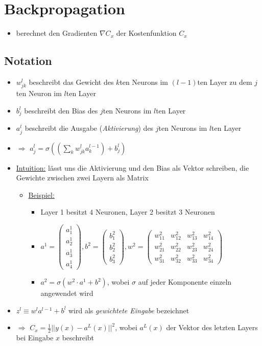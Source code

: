 \section{Backpropagation}

\begin{itemize}
\item berechnet den Gradienten $\nabla C_x$ der Kostenfunktion $C_x$
\end{itemize}

\subsection{Notation}

\begin{itemize}
  \item $w_{jk}^l$ beschreibt das Gewicht des $k$ten Neurons im $(l-1)$ten Layer zu dem $j$ten Neuron im $l$ten Layer
  \item $b_j^l$ beschreibt den Bias des $j$ten Neurons im $l$ten Layer
  \item $a_j^l$ beschreibt die Ausgabe (\emph{Aktivierung}) des $j$ten Neurons im $l$ten Layer
  \item $\Rightarrow$ $a_j^l = \sigma {( {(\sum_k w_{jk}^l a_k^{l-1})} + b_j^l)}$
  \item \underline{Intuition:} lässt uns die Aktivierung und den Bias als Vektor schreiben, die Gewichte zwischen zwei Layern als Matrix
  \begin{itemize}
    \item \underline{Beispiel:}
    \begin{itemize}
      \item Layer 1 besitzt 4 Neuronen, Layer 2 besitzt 3 Neuronen
      \item $a^1 = \begin{pmatrix}a_1^1\\a_2^1\\a_3^1\\a_4^1\end{pmatrix}, b^2 = \begin{pmatrix}b_1^2\\b_2^2\\b_3^2\end{pmatrix}, w^2 = \begin{pmatrix}w^2_{11}&w^2_{12}&w^2_{13}&w^2_{14}\\w^2_{21}&w^2_{22}&w^2_{23}&w^2_{24}\\w^2_{31}&w^2_{32}&w^2_{33}&w^2_{34}\end{pmatrix}$
      \item $a^2 = \sigma{(w^2 \cdot a^1 + b^2)}$, wobei $\sigma$ auf jeder Komponente einzeln angewendet wird
    \end{itemize}
  \end{itemize}
  \item $z^l \equiv w^l a^{l-1}+b^l$ wird als \emph{gewichtete Eingabe} bezeichnet
  \item $\Rightarrow$ $C_x = \frac{1}{2} ||y(x) - a^L(x)||^2$, wobei $a^L(x)$ der Vektor des letzten Layers bei Eingabe $x$ beschreibt
\end{itemize}

